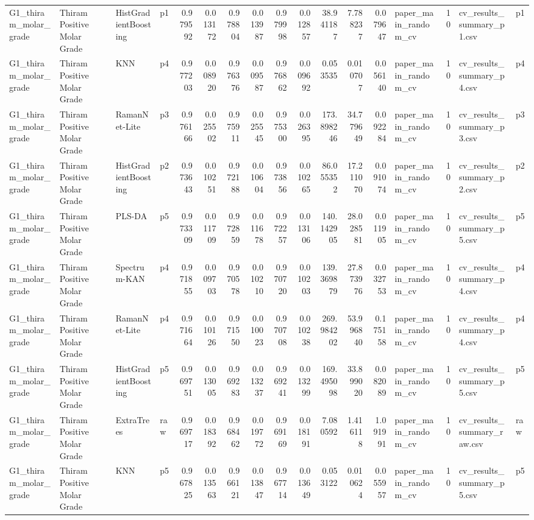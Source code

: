 \begin{tabular}{llllrrrrrrrrrlrll}
G1_thiram_molar_grade & Thiram Positive Molar Grade & HistGradientBoosting & p1 & 0.979592 & 0.013172 & 0.978804 & 0.013987 & 0.979998 & 0.012857 & 38.941187 & 7.788237 & 0.079647 & paper_main_random_cv & 10 & cv_results_summary_p1.csv & p1 \\
G1_thiram_molar_grade & Thiram Positive Molar Grade & KNN & p4 & 0.977203 & 0.008920 & 0.976376 & 0.009587 & 0.976862 & 0.009692 & 0.053535 & 0.010707 & 0.056140 & paper_main_random_cv & 10 & cv_results_summary_p4.csv & p4 \\
G1_thiram_molar_grade & Thiram Positive Molar Grade & RamanNet-Lite & p3 & 0.976166 & 0.025502 & 0.975911 & 0.025545 & 0.975300 & 0.026395 & 173.898246 & 34.779649 & 0.092284 & paper_main_random_cv & 10 & cv_results_summary_p3.csv & p3 \\
G1_thiram_molar_grade & Thiram Positive Molar Grade & HistGradientBoosting & p2 & 0.973643 & 0.010251 & 0.972188 & 0.010604 & 0.973856 & 0.010265 & 86.055352 & 17.211070 & 0.091074 & paper_main_random_cv & 10 & cv_results_summary_p2.csv & p2 \\
G1_thiram_molar_grade & Thiram Positive Molar Grade & PLS-DA & p5 & 0.973309 & 0.011709 & 0.972859 & 0.011678 & 0.972257 & 0.013106 & 140.142905 & 28.028581 & 0.011905 & paper_main_random_cv & 10 & cv_results_summary_p5.csv & p5 \\
G1_thiram_molar_grade & Thiram Positive Molar Grade & Spectrum-KAN & p4 & 0.971855 & 0.009703 & 0.970578 & 0.010210 & 0.970720 & 0.010203 & 139.369879 & 27.873976 & 0.032753 & paper_main_random_cv & 10 & cv_results_summary_p4.csv & p4 \\
G1_thiram_molar_grade & Thiram Positive Molar Grade & RamanNet-Lite & p4 & 0.971664 & 0.010126 & 0.971550 & 0.010023 & 0.970708 & 0.010238 & 269.984202 & 53.996840 & 0.175158 & paper_main_random_cv & 10 & cv_results_summary_p4.csv & p4 \\
G1_thiram_molar_grade & Thiram Positive Molar Grade & HistGradientBoosting & p5 & 0.969751 & 0.013005 & 0.969283 & 0.013237 & 0.969241 & 0.013299 & 169.495098 & 33.899020 & 0.082089 & paper_main_random_cv & 10 & cv_results_summary_p5.csv & p5 \\
G1_thiram_molar_grade & Thiram Positive Molar Grade & ExtraTrees & raw & 0.969717 & 0.018392 & 0.968462 & 0.019772 & 0.969169 & 0.018191 & 7.080592 & 1.416118 & 1.091991 & paper_main_random_cv & 10 & cv_results_summary_raw.csv & raw \\
G1_thiram_molar_grade & Thiram Positive Molar Grade & KNN & p5 & 0.967825 & 0.013563 & 0.966121 & 0.013847 & 0.967714 & 0.013649 & 0.053122 & 0.010624 & 0.055957 & paper_main_random_cv & 10 & cv_results_summary_p5.csv & p5 \\

\end{tabular}
